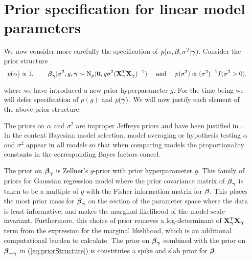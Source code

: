  
 
\section{Prior specification for linear model parameters}
\label{sec:model}

We now consider more carefully the specification of $p(\alpha,{\boldsymbol \beta},\sigma^2|{\boldsymbol \gamma})$.
Consider the prior structure
\begin{equation}
\label{eq:priorStructure}
\begin{array}{c}
\displaystyle p(\alpha) \propto 1,  
\qquad 
{\boldsymbol\beta}_{\boldsymbol \gamma} | \sigma^2, g, {\boldsymbol \gamma} \sim \text{N}_p({\bf 0}, g \sigma^2 ({\bf X}_{\boldsymbol \gamma}^T {\bf X}_{\boldsymbol \gamma})^{-1})
\quad \text{ and }  \quad 
\displaystyle p(\sigma^2) \propto (\sigma^2)^{-1} I(\sigma^2 > 0),                      
\end{array}
\end{equation} 

\noindent where we have introduced a new prior hyperparameter $g$.
For the time being we will defer specification of $p(g)$ and $p({\boldsymbol \gamma})$.
We will now justify each element of the above prior structure.

The priors on $\alpha$ and $\sigma^2$ are improper Jeffreys priors and have been justified 
in \cite{Berger2012}. In the context Bayesian model selection, model averaging or hypothesis 
testing $\alpha$ and $\sigma^2$ appear in all models 
so that when comparing models the proportionality constants in the corresponding
Bayes factors cancel.

The prior on ${\boldsymbol \beta}_{\boldsymbol \gamma}$ is Zellner's $g$-prior \citep[see for example,][]{Zellner1986} with prior 
hyperparameter $g$. This family of priors for Gaussian regression model where the prior covariance 
matrix of ${\boldsymbol \beta}_{\boldsymbol \gamma}$ is taken to be a multiple of $g$ with the Fisher information matrix for ${\boldsymbol \beta}$. 
This places the most prior mass for ${\boldsymbol \beta}_{\boldsymbol \gamma}$ on the section of the parameter space where the data is 
least informative, and makes the marginal likelihood of the model scale-invariant. Furthermore, this 
choice of prior removes a log-determinant of ${\bf X}_{\boldsymbol \gamma}^T{\bf X}_{\boldsymbol \gamma}$ term from the expression for the marginal 
likelihood, which is an additional computational burden to calculate.
The prior on ${\boldsymbol \beta}_{\boldsymbol \gamma}$ combined with the prior on ${\boldsymbol \beta}_{-{\boldsymbol \gamma}}$
in (\ref{eq:priorStructure}) is constitutes  a spike and slab prior for ${\boldsymbol \beta}$.
 
